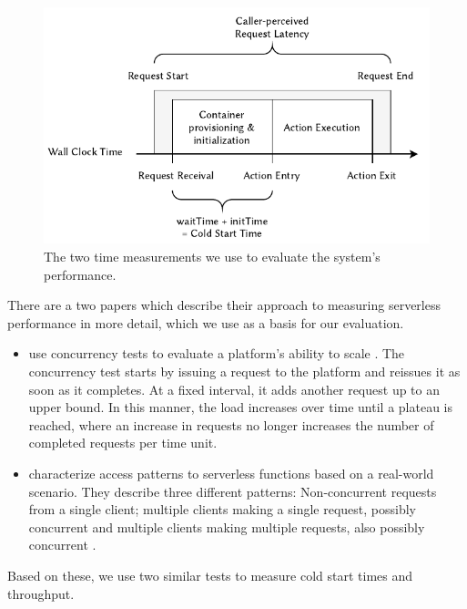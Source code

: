 \begin{figure}
    \centering
    \includegraphics{figures/EvaluationTimeMeasurement.pdf}
    \caption{The two time measurements we use to evaluate the system's performance.}
    \label{fig:evaluation-time-measurement}
\end{figure}

There are a two papers which describe their approach to measuring serverless performance in more detail, which we use as a basis for our evaluation.

\begin{itemize}
    \item \citeauthor{McGrath2017} use concurrency tests to evaluate a platform's ability to scale \cite{McGrath2017}. The concurrency test starts by issuing a request to the platform and reissues it as soon as it completes. At a fixed interval, it adds another request up to an upper bound. In this manner, the load increases over time until a plateau is reached, where an increase in requests no longer increases the number of completed requests per time unit.
    \item \citeauthor{Hall2019} characterize access patterns to serverless functions based on a real-world scenario. They describe three different patterns: Non-concurrent requests from a single client; multiple clients making a single request, possibly concurrent and multiple clients making multiple requests, also possibly concurrent \cite{Hall2019}.
\end{itemize}

Based on these, we use two similar tests to measure cold start times and throughput.

